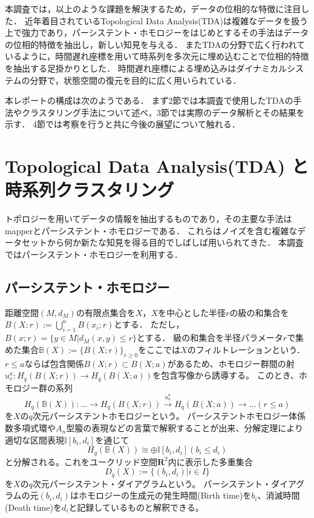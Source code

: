 \documentclass{jarticle}
\begin{document}
本調査では，以上のような課題を解決するため，データの位相的な特徴に注目した．
近年着目されているTopological Data Analysis(TDA)は複雑なデータを扱う上で強力であり，パーシステント・ホモロジーをはじめとするその手法はデータの位相的特徴を抽出し，新しい知見を与える．
またTDAの分野で広く行われているように，時間遅れ座標を用いて時系列を多次元に埋め込むことで位相的特徴を抽出する足掛かりとした．
時間遅れ座標による埋め込みはダイナミカルシステムの分野で，状態空間の復元を目的に広く用いられている．

本レポートの構成は次のようである．
まず2節では本調査で使用したTDAの手法やクラスタリング手法について述べ，3節では実際のデータ解析とその結果を示す．
4節では考察を行うと共に今後の展望について触れる．

\section{Topological Data Analysis(TDA) と時系列クラスタリング}
トポロジーを用いてデータの情報を抽出するものであり，その主要な手法はmapper\cite{Singh2007}とパーシステント・ホモロジー\cite{Edelsbrunner2002}である．
これらはノイズを含む複雑なデータセットから何か新たな知見を得る目的でしばしば用いられてきた．
本調査ではパーシステント・ホモロジーを利用する．

\subsection{パーシステント・ホモロジー}
距離空間$(M, d_M)$の有限点集合を$X$，$X$を中心とした半径$r$の級の和集合を$B(X;r):=\bigcup_{i=1}^n B(x_i;r)$とする．
ただし，$B(x;r) =\{y \in M | d_M(x,y) \leq r\}$とする．
級の和集合を半径パラメータ$r$で集めた集合$\mathbb B(X):=\{B(X;r)\}_{r\geq 0}$をここでは$X$のフィルトレーションという．
$r\leq a$ならば包含関係$B(X;r)\subset B(X;a)$があるため、ホモロジー群間の射$u_r^a : H_q(B(X;r))\rightarrow H_q(B(X;a)) $を包含写像から誘導する。
このとき、ホモロジー群の系列
$$
H_q(\mathbb B(X)):\dots\rightarrow H_q(B(X;r))\overset{u_a^b}{\rightarrow} H_q(B(X;a))\rightarrow\dots (r\leq a)
$$
を$X$の$q$次元パーシステントホモロジーという。
パーシステントホモロジー体係数多項式環や$A_n$型箙の表現などの言葉で解釈することが出来、分解定理により適切な区間表現$\mathbb I[b_i, d_i] $を通じて
$$
H_q(\mathbb B(X))\cong\oplus\mathbb I[b_i,d_i] (b_i\leq d_i)
$$
と分解される。これをユークリッド空間$\mathbf R^2$内に表示した多重集合
$$
D_q(X):= \{(b_i,d_i) | i \in I\}
$$
を$X$の$q$次元パーシステント・ダイアグラムという。
パーシステント・ダイアグラムの元$(b_i, d_i)$はホモロジーの生成元の発生時間(Birth time)を$b_i$、消滅時間(Death time)を$d_i$と記録しているものと解釈できる。
\end{document}
